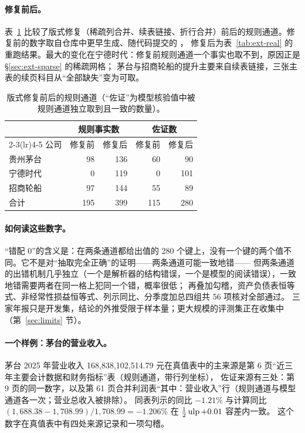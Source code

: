 \paragraph{修复前后。}
表~\ref{tab:ext-before-after} 比较了版式修复（稀疏列合并、续表链接、折行合并）前后的规则通道。修复前的数字取自仓库中更早生成、随代码提交的 ，
修复后为表~\ref{tab:ext-real} 的重跑结果。最大的变化在宁德时代：修复前规则通道一个事实也取不到，原因正是 \S\ref{sec:ext-sparse} 的稀疏网格；
茅台与招商轮船的提升主要来自续表链接，三张主表的续页科目从“全部缺失”变为可取。

\begin{table}[t]
\centering
\caption{版式修复前后的规则通道（“佐证”为模型核验值中被规则通道独立取到且一致的数量）。}
\label{tab:ext-before-after}
\small
\begin{tabular}{lrrrr}
\toprule
 & \multicolumn{2}{c}{规则事实数} & \multicolumn{2}{c}{佐证数} \\
\cmidrule(lr){2-3}\cmidrule(lr){4-5}
公司 & 修复前 & 修复后 & 修复前 & 修复后 \\
\midrule
贵州茅台 & 98 & 136 & 60 & 90 \\
宁德时代 & 0 & 119 & 0 & 101 \\
招商轮船 & 97 & 144 & 55 & 89 \\
\midrule
合计 & 195 & 399 & 115 & 280 \\
\bottomrule
\end{tabular}
\end{table}

\paragraph{如何读这些数字。}
“错配 0”的含义是：在两条通道都给出值的 280 个键上，没有一个键的两个值不同。它不是对“抽取完全正确”的证明——两条通道可能一致地错——
但两条通道的出错机制几乎独立（一个是解析器的结构错误，一个是模型的阅读错误），一致地错需要两者在同一格上犯同一个错，概率很低；
再叠加勾稽，资产负债表恒等式、非经常性损益恒等式、列示同比、分季度加总四组共 56 项核对全部通过。
三家年报只是开发集，结论的外推受限于样本量；更大规模的评测集正在收集中（第~\ref{sec:limits} 节）。

\paragraph{一个样例：茅台的营业收入。}
茅台 2025 年营业收入 168,838,102,514.79 元在真值表中的主来源是第 6 页“近三年主要会计数据和财务指标”表（规则通道，带行列坐标），
佐证来源有三处：第 9 页的同一数字，以及第 61 页合并利润表“其中：营业收入”行（规则通道与模型通道各一次；营业总收入被排除）。
同表列示的同比 $-1.21\%$ 与计算同比 $(1{,}688.38-1{,}708.99)/1{,}708.99=-1.206\%$ 在 $\tfrac12\operatorname{ulp}+0.01$ 容差内一致。
这个数字在真值表中有四处来源记录和一项勾稽。

